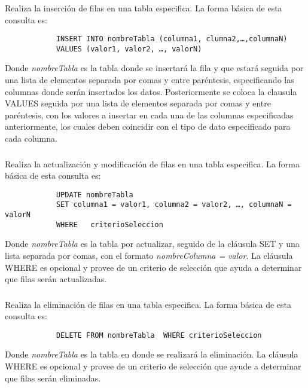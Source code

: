\documentclass[10pt,a4paper]{article} %
\begin{document}
	\subsubsection{\color{colorESCOM}{Clausula INSERT}}
	{\large Realiza la inserci{\' o}n de filas en una tabla especifica.  La forma b{\' a}sica de esta consulta es:
		
		\begin{lstlisting}
			INSERT INTO nombreTabla (columna1, clumna2,…,columnaN)
			VALUES (valor1, valor2, …, valorN)
		\end{lstlisting}
		
		Donde \textit{nombreTabla} es la tabla donde se insertar{\' a} la fila y que estar{\' a} seguida por una lista de elementos separada por comas y entre paréntesis, especificando las columnas donde ser{\' a}n insertados los datos. Posteriormente se coloca la clausula VALUES seguida por una lista de elementos separada por comas y entre paréntesis, con los valores a insertar en cada una de las columnas especificadas anteriormente, los cuales deben coincidir con el tipo de dato especificado para cada columna.}
	
	\subsubsection{\color{colorESCOM}{Clausula UPDATE}}
	{\large Realiza la actualizaci{\' o}n y modificaci{\' o}n de filas en una tabla especifica.  La forma b{\' a}sica de esta consulta es:
		
		\begin{lstlisting}
			UPDATE nombreTabla
			SET columna1 = valor1, columna2 = valor2, …, columnaN = valorN
			WHERE   criterioSeleccion
		\end{lstlisting}
		
		Donde \textit{nombreTabla} es la tabla por actualizar, seguido de la cl{\' a}usula SET y una lista separada por comas, con el formato \textit{nombreColumna = valor}. La cl{\' a}usula WHERE es opcional y provee de un criterio de selecci{\' o}n que ayuda a determinar que filas ser{\' a}n actualizadas.}
	
	\subsubsection{\color{colorESCOM}{Clausula DELETE}}
	{\large Realiza la eliminaci{\' o}n de filas en una tabla especifica.  La forma b{\' a}sica de esta consulta es:
		
		\begin{lstlisting}
			DELETE FROM nombreTabla  WHERE criterioSeleccion
		\end{lstlisting}
		
		Donde \textit{nombreTabla} es la tabla en donde se realizar{\' a} la eliminaci{\' o}n. La cl{\' a}usula WHERE es opcional y provee de un criterio de selecci{\' o}n que ayude a determinar que filas ser{\' a}n eliminadas.}
	
\end{document}
